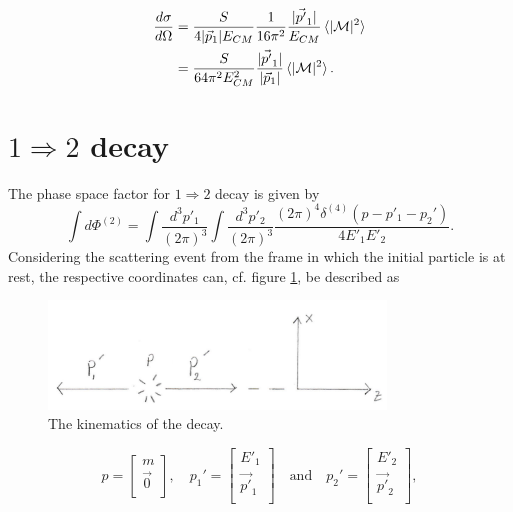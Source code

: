 \begin{equation}
	\begin{split}
		\frac{d\sigma}{d\Omega}&=\frac{S}{4|\vec{p}_1| E_{CM}}\frac{1}{16\pi^2}   \frac{|\vec{p'}_1|}{E_{CM}}\braket{|\mathcal{M}|^2}\\
		&=\frac{S}{64\pi^2E_{CM}^2}   \frac{|\vec{p'}_1|}{|\vec{p}_1|}\braket{|\mathcal{M}|^2}.\\
	\end{split}
	\label{diffcrossmass1}
\end{equation} 

\section{$1\Rightarrow 2$ decay}
The phase space factor for $1\Rightarrow 2$ decay is given by
\begin{equation}
	\int d\Phi^{(2)}=\int\frac{d^3p'_1}{(2\pi)^3}\int\frac{d^3p'_2}{(2\pi)^3}\frac{(2\pi)^4\delta^{(4)}(p-p'_1-p_2')}{4E'_{1}E'_{2}}.
\end{equation} 
Considering the scattering event from the frame in which the initial particle is at rest, the respective coordinates can, cf. figure \ref{fig:21}, be described as
\begin{figure}[H]
	\captionsetup{width=1\textwidth}
	\centering
	\includegraphics[width=0.8\textwidth]{figures/scat5}
	\caption{The kinematics of the decay.}
	\label{fig:21}
\end{figure}
\begin{equation}
	p=\begin{bmatrix}
		m \\ \vec{0}\\
	\end{bmatrix}, \quad 
	p_1'=\begin{bmatrix}
		E'_1 \\ \vec{p'}_1\\
	\end{bmatrix} \quad \text{and}\quad
	p_2'=\begin{bmatrix}
		E'_2 \\ \vec{p'}_2\\
	\end{bmatrix},
\end{equation}  
